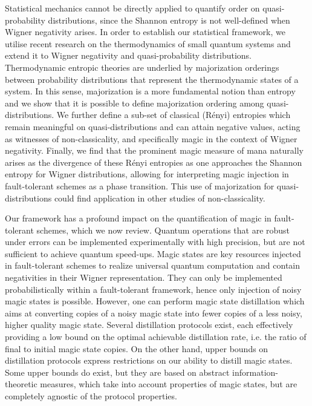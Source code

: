 \documentclass[12pt]{letter}
\begin{document}
Statistical mechanics cannot be directly applied to quantify order on quasi-probability distributions, since the Shannon entropy is not well-defined when Wigner negativity arises.
In order to establish our statistical framework, we utilise recent research on the thermodynamics of small quantum systems and extend it to Wigner negativity and quasi-probability distributions.
Thermodynamic entropic theories are underlied by majorization orderings between probability distributions that represent the thermodynamic states of a system.
In this sense, majorization is a more fundamental notion than entropy and we show that it is possible to define majorization ordering among quasi-distributions.
We further define a sub-set of classical (R\'{e}nyi) entropies which remain meaningful on quasi-distributions and can attain negative values, acting as witnesses of non-classicality, and specifically magic in the context of Wigner negativity.
Finally, we find that the prominent magic measure of mana naturally arises as the divergence of these R\'{e}nyi entropies as one approaches the Shannon entropy for Wigner distributions, allowing for interpreting magic injection in fault-tolerant schemes as a phase transition.
This use of majorization for quasi-distributions could find application in other studies of non-classicality.

Our framework has a profound impact on the quantification of magic in fault-tolerant schemes, which we now review.
Quantum operations that are robust under errors can be implemented experimentally with high precision, but are not sufficient to achieve quantum speed-ups.
Magic states are key resources injected in fault-tolerant schemes to realize universal quantum computation and contain negativities in their Wigner representation.
They can only be implemented probabilistically within a fault-tolerant framework, hence only injection of noisy magic states is possible.
However, one can perform magic state distillation which aims at converting copies of a noisy magic state into fewer copies of a less noisy, higher quality magic state.
Several distillation protocols exist, each effectively providing a low bound on the optimal achievable distillation rate, i.e. the ratio of final to initial magic state copies. 
On the other hand, upper bounds on distillation protocols express restrictions on our ability to distill magic states. 
Some upper bounds do exist, but they are based on abstract information-theoretic measures, which take into account properties of magic states, but are completely agnostic of the protocol properties. 
\end{document}
